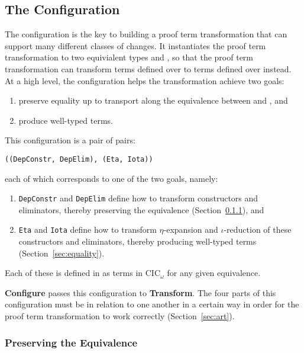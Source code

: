 \subsection{The Configuration}
\label{sec:configurable}

The configuration is the key to building a proof term transformation that can support many different classes of changes.
It instantiates the proof term transformation to two equivialent types \A and \B, so that the proof term transformation
can transform terms defined over \A to terms defined over \B instead.
At a high level, the configuration helps the transformation achieve two goals:

\begin{enumerate}
\item preserve equality up to transport along the equivalence between \A and \B, and
\item produce well-typed terms.
\end{enumerate}
This configuration is a pair of pairs:

\begin{lstlisting}
((DepConstr, DepElim), (Eta, Iota))
\end{lstlisting}
each of which corresponds to one of the two goals, namely:

\begin{enumerate}
\item \lstinline{DepConstr} and \lstinline{DepElim} define how to transform constructors and eliminators, thereby preserving the equivalence (Section~\ref{sec:equivalence}), and 
\item \lstinline{Eta} and \lstinline{Iota} define how to transform $\eta$-expansion and $\iota$-reduction of these constructors and eliminators, thereby producing well-typed terms (Section~\ref{sec:equality}).
\end{enumerate}
Each of these is defined in as terms in CIC$_{\omega}$ for any given equivalence.

\textbf{Configure} passes this configuration to \textbf{Transform}.
The four parts of this configuration must be in relation to one another in a certain way in order for the proof
term transformation to work correctly (Section~\ref{sec:art}).

\subsubsection{Preserving the Equivalence}
\label{sec:equivalence}

